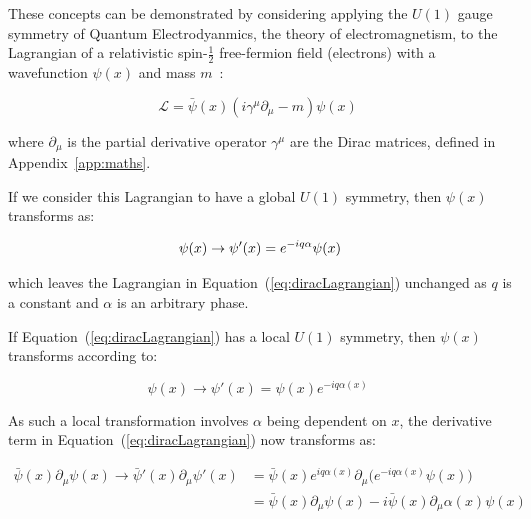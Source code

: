These concepts can be demonstrated by considering applying the $U(1)$ gauge symmetry of Quantum Electrodyanmics, the theory of electromagnetism, to the Lagrangian of a relativistic spin-$\frac{1}{2}$ free-fermion field (\eg electrons) with a wavefunction $\psi(x)$ and mass $m$~\cite{QFT}:

\begin{equation}
\mathcal{L} = \bar{\psi}(x) (i {\gamma}^{\mu} \partial_{\mu} - m) \psi(x) \;
\label{eq:diracLagrangian}
\end{equation}

where $\partial_{\mu}$ is the partial derivative operator ${\gamma}^{\mu}$ are the Dirac matrices, defined in Appendix~\ref{app:maths}.

If we consider this Lagrangian to have a global $U(1)$ symmetry, then $\psi(x)$ transforms as:

\begin{equation}
\psi(x) \rightarrow \psi'(x) = e^{-i q \alpha} \psi(x) \\
\label{eq:globalTransformation}
\end{equation}

which leaves the Lagrangian in Equation~(\ref{eq:diracLagrangian}) unchanged as $q$ is a constant and $\alpha$ is an arbitrary phase.

If Equation~(\ref{eq:diracLagrangian}) has a local $U(1)$ symmetry, then $\psi(x)$ transforms according to:

\begin{equation}
\psi(x) \rightarrow \psi'(x) = \psi(x) e^{-i q \alpha (x) } \;
\label{eq:localTransformation}
\end{equation}

As such a local transformation involves $\alpha$ being dependent on $x$, the derivative term in Equation~(\ref{eq:diracLagrangian}) now transforms as:

\begin{equation}
\begin{split}
\bar{\psi}(x) \partial_{\mu} \psi(x) \rightarrow \bar{\psi}'(x) \partial_{\mu} \psi'(x) &= \bar{\psi} (x) e^{i q \alpha (x) } \partial_{\mu} \big(e^{-i q \alpha (x) } \psi(x) \big) \\
&= \bar{\psi} (x) \partial_{\mu} \psi(x) - i \bar{\psi} (x) \partial_{\mu} \alpha (x) \psi(x) \\
\end{split}
\label{eq:derivativeLocalTransformation}
\end{equation}

